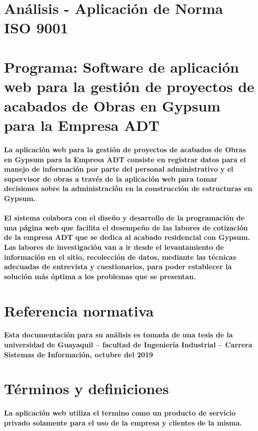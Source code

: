 \documentclass[12pt,a4paper]{article}
\begin{document}
\section*{Análisis - Aplicación de Norma ISO 9001}
\section{Programa: Software de aplicación web para la gestión de proyectos de acabados de Obras 
en Gypsum para la Empresa ADT} 
\paragraph*{La aplicación web para la gestión de proyectos de acabados de Obras en Gypsum para la Empresa ADT consiste en registrar datos para el manejo de información por parte del personal administrativo y el supervisor de obras a través de la aplicación web para tomar decisiones sobre la administración en la construcción de estructuras en Gypsum.}
\paragraph{El sistema colabora con el diseño y desarrollo de la programación de una página web que facilita el desempeño de las labores de cotización de la empresa ADT que se dedica al acabado residencial con Gypsum. Las labores de investigación van a ir desde el levantamiento de información en el sitio, recolección de datos, mediante las técnicas adecuadas de entrevista y cuestionarios, para poder establecer la solución más óptima a los problemas que se presentan.}
\section{Referencia normativa}
\paragraph{Esta documentación para su análisis es tomada de una tesis de la universidad de Guayaquil – facultad de Ingeniería Industrial – Carrera Sistemas de Información, octubre del 2019}
\section{Términos y definiciones}
\paragraph{La aplicación web utiliza el termino como un producto de servicio privado solamente para el uso de la empresa y clientes de la misma.}
\end{document}
